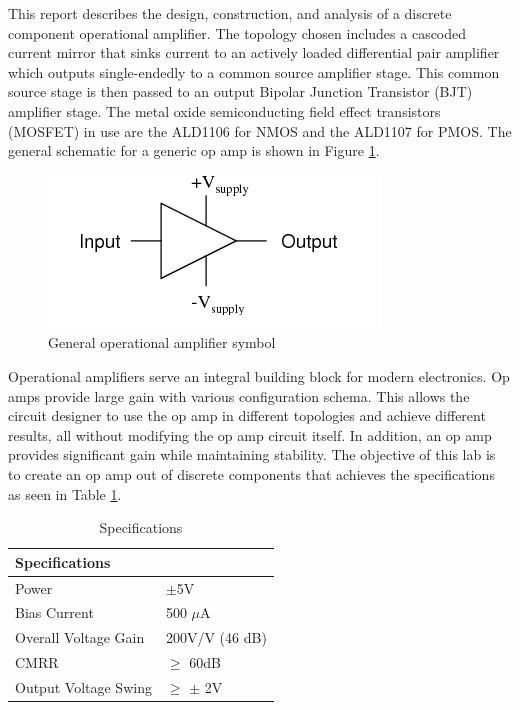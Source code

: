 



This report describes the design, construction, and analysis of a discrete component operational amplifier. The topology chosen includes a cascoded current mirror that sinks current to an actively loaded differential pair amplifier which outputs single-endedly to a common source amplifier stage. This common source stage is then passed to an output Bipolar Junction Transistor (BJT) amplifier stage. The metal oxide semiconducting field effect transistors (MOSFET) in use are the ALD1106 for NMOS and the ALD1107 for PMOS. The general schematic for a generic op amp is shown in Figure \ref{fig:gen_schem}.

\begin{figure}[H]
    \begin{center}
    \includegraphics[scale=.45]{Introduction/genericopamp.png}
    \caption{General operational amplifier symbol \cite{b1}}
    \label{fig:gen_schem}
    \end{center}
    
\end{figure}
Operational amplifiers serve an integral building block for modern electronics. Op amps provide large gain with various configuration schema. This allows the circuit designer to use the op amp in different topologies and achieve different results, all without modifying the op amp circuit itself. In addition, an op amp provides significant gain while maintaining stability. The objective of this lab is to create an op amp out of discrete components that achieves the specifications as seen in Table \ref{tab:labspecs}.


\begin{table}[H]
\centering
\caption{Specifications}
\label{tab:labspecs}
\begin{tabular}{|l|l|}
\hline
\textbf{Specifications} &                 \\ \hline
Power                   & $\pm$5V         \\ \hline
Bias Current            & 500 $\mu$A      \\ \hline
Overall Voltage Gain    & 200V/V (46 dB)  \\ \hline
CMRR                    & $\geq$ 60dB     \\ \hline
Output Voltage Swing    & $\geq$ $\pm$ 2V \\ \hline
\end{tabular}
\end{table}

